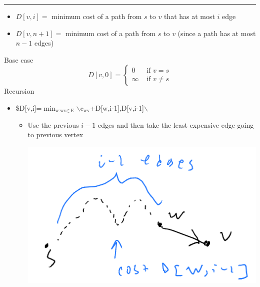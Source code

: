 \documentclass[11pt]{article}
\begin{document}
\noindent\rule{\textwidth}{0.5pt}
\begin{itemize}
\item \(D[v,i]=\) minimum cost of a path from \(s\) to \(v\) that has at most \(i\) edge
\item \(D[v,n + 1]=\) minimum cost of a path from \(s\) to \(v\) (since a path has at most \(n-1\) edges)
\end{itemize}
Base case
\begin{equation*}
D[v,0] = 
\begin{cases}
0 & \text{ if }v=s
\\ \infty & \text{ if } v \neq s
\end{cases}
\end{equation*}
Recursion
\begin{itemize}
\item \$D[v,i]=\(\min_{\text{w:wv}\in\ \text{E}}\)$\backslash${c\(_{\text{wv}}\)+D[w,i-1],D[v,i-1]$\backslash$}
\begin{itemize}
\item Use the previous \(i-1\) edges and then take the least expensive edge going to previous vertex
\begin{center}
\includegraphics[width=.9\linewidth]{./Images/i98.png}
\end{center}
\end{itemize}
\end{itemize}
\end{document}
